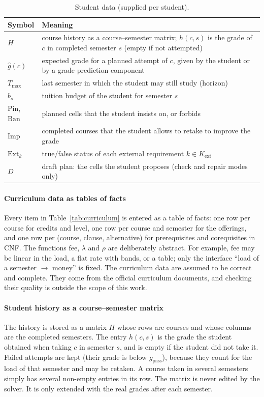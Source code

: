 \begin{table}[ht]
\centering
\small
\begin{tabular}{@{}p{3.1cm}>{\raggedright\arraybackslash}p{10.2cm}@{}}
\toprule
\textbf{Symbol} & \textbf{Meaning} \\
\midrule
$H$ & course history as a course--semester matrix; $h(c,s)$ is the grade of $c$ in completed semester $s$ (empty if not attempted) \\
$\hat g(c)$ & expected grade for a planned attempt of $c$, given by the student or by a grade-prediction component \\
$T_{\max}$ & last semester in which the student may still study (horizon) \\
$b_s$ & tuition budget of the student for semester $s$ \\
$\mathrm{Pin}$, $\mathrm{Ban}$ & planned cells that the student insists on, or forbids \\
$\mathrm{Imp}$ & completed courses that the student allows to retake to improve the grade \\
$\mathrm{Ext}_k$ & true/false status of each external requirement $k\in K_{\mathrm{ext}}$ \\
$D$ & draft plan: the cells the student proposes (check and repair modes only) \\
\bottomrule
\end{tabular}
\caption{Student data (supplied per student).}
\label{tab:student}
\end{table}

\paragraph{Curriculum data as tables of facts}
Every item in Table~\ref{tab:curriculum} is entered as a table of facts: one row per course for credits and level, one row per course and semester for the offerings, and one row per (course, clause, alternative) for prerequisites and corequisites in CNF. The functions $\mathrm{fee}$, $\lambda$ and $\rho$ are deliberately abstract. For example, $\mathrm{fee}$ may be linear in the load, a flat rate with bands, or a table; only the interface ``load of a semester $\to$ money'' is fixed. The curriculum data are assumed to be
correct and complete. They come from the official curriculum documents, and checking their quality is outside the scope of this work.

\paragraph{Student history as a course--semester matrix}
The history is stored as a matrix $H$ whose rows are courses and whose columns are the completed semesters. The entry $h(c,s)$ is the grade the student obtained when taking $c$ in semester $s$, and is empty if the student did not take it. Failed attempts are kept (their grade is below
$g_{\mathrm{pass}}$), because they count for the load of that semester and may be retaken. A course taken in several semesters simply has several non-empty entries in its row. The matrix is never edited by the solver. It is only extended with the real grades after each semester.


